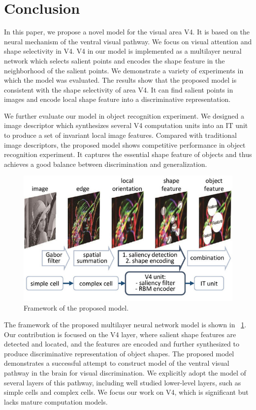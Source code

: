 \documentclass[10pt]{article}
\begin{document}
\section{Conclusion}\label{sec:6}

In this paper, we propose a novel model for the visual area V4.
It is based on the neural mechanism of the ventral visual pathway.
We focus on visual attention and shape selectivity in V4.
V4 in our model is implemented as a multilayer neural network 
which selects salient points and encodes the shape feature in the neighborhood of the salient points.
We demonstrate a variety of experiments in which the model was evaluated.
The results show that the proposed model is consistent with the shape selectivity of area V4.
It can find salient points in images and encode local shape feature into a discriminative representation.

We further evaluate our model in object recognition experiment.
We designed a image descriptor which synthesizes several V4 computation units
into an IT unit to produce a set of invariant local image features.
Compared with traditional image descriptors,
the proposed model shows competitive performance in object recognition experiment. 
It captures the essential shape feature of objects
and thus achieves a good balance between discrimination and generalization.

\begin{figure}
\centering
\includegraphics[width=0.9\linewidth]{images/fig-17.jpg}
\caption{Framework of the proposed model.}
\label{fig:17}
\end{figure}

The framework of the proposed multilayer neural network model is shown in \figurename~\ref{fig:17}.
Our contribution is focused on the V4 layer,
where salient shape features are detected and located,
and the features are encoded and further synthesized to produce discriminative representation of object shapes.
The proposed model demonstrates a successful attempt to construct model of the ventral visual pathway
in the brain for visual discrimination.
We explicitly adopt the model of several layers of this pathway,
including well studied lower-level layers, such as simple cells and complex cells.
We focus our work on V4, which is significant but lacks mature computation models.
\end{document}
